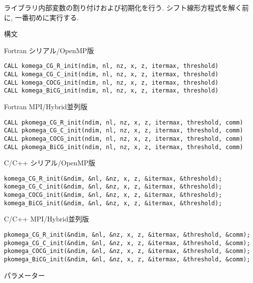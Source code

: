 \documentclass[12pt,titlepage]{jarticle}
\begin{document}
ライブラリ内部変数の割り付けおよび初期化を行う.
シフト線形方程式を解く前に, 一番初めに実行する.

\noindent 構文

\noindent Fortran シリアル/OpenMP版
\begin{verbatim}
CALL komega_CG_R_init(ndim, nl, nz, x, z, itermax, threshold)
CALL komega_CG_C_init(ndim, nl, nz, x, z, itermax, threshold)
CALL komega_COCG_init(ndim, nl, nz, x, z, itermax, threshold)
CALL komega_BiCG_init(ndim, nl, nz, x, z, itermax, threshold)
\end{verbatim}

\noindent Fortran MPI/Hybrid並列版
\begin{verbatim}
CALL pkomega_CG_R_init(ndim, nl, nz, x, z, itermax, threshold, comm)
CALL pkomega_CG_C_init(ndim, nl, nz, x, z, itermax, threshold, comm)
CALL pkomega_COCG_init(ndim, nl, nz, x, z, itermax, threshold, comm)
CALL pkomega_BiCG_init(ndim, nl, nz, x, z, itermax, threshold, comm)
\end{verbatim}

\noindent C/C++ シリアル/OpenMP版
\begin{verbatim}
komega_CG_R_init(&ndim, &nl, &nz, x, z, &itermax, &threshold);
komega_CG_C_init(&ndim, &nl, &nz, x, z, &itermax, &threshold);
komega_COCG_init(&ndim, &nl, &nz, x, z, &itermax, &threshold);
komega_BiCG_init(&ndim, &nl, &nz, x, z, &itermax, &threshold);
\end{verbatim}

\noindent C/C++ MPI/Hybrid並列版
\begin{verbatim}
pkomega_CG_R_init(&ndim, &nl, &nz, x, z, &itermax, &threshold, &comm);
pkomega_CG_C_init(&ndim, &nl, &nz, x, z, &itermax, &threshold, &comm);
pkomega_COCG_init(&ndim, &nl, &nz, x, z, &itermax, &threshold, &comm);
pkomega_BiCG_init(&ndim, &nl, &nz, x, z, &itermax, &threshold, &comm);
\end{verbatim}

\noindent パラメーター
\end{document}
